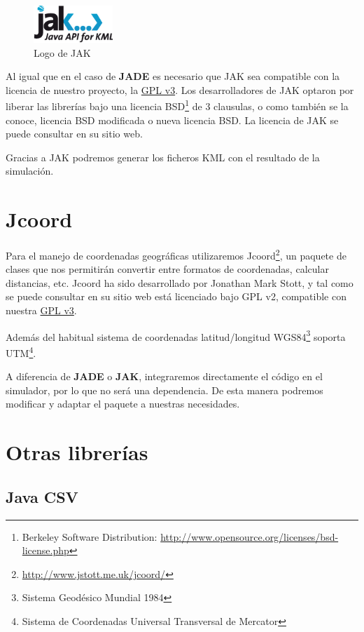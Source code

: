 \begin{figure}[H]
 \centering
 \includegraphics[width=30mm]{figuras/cap4/jak.png}
 \caption{Logo de JAK}
\end{figure}

Al igual que en el caso de {\bf JADE} es necesario que JAK sea compatible con
la licencia de nuestro proyecto, la \hyperref[ap1]{GPL v3}.
Los desarrolladores de JAK optaron por liberar las librerías bajo una licencia
BSD\footnote{Berkeley Software Distribution:
\url{http://www.opensource.org/licenses/bsd-license.php}} de 3 clausulas, o como
también se la conoce, licencia BSD modificada o nueva licencia BSD. La licencia
de JAK se puede consultar en su sitio web.

Gracias a JAK podremos generar los ficheros KML con el resultado de la
simulación.

\section{Jcoord}

Para el manejo de coordenadas geográficas utilizaremos
Jcoord\footnote{\url{http://www.jstott.me.uk/jcoord/}}, un paquete de clases que
nos permitirán convertir entre formatos de coordenadas, calcular distancias,
etc. Jcoord ha sido desarrollado por Jonathan Mark Stott, y tal como se puede
consultar en su sitio web está licenciado bajo GPL v2, compatible con nuestra
\hyperref[ap1]{GPL v3}.

Además del habitual sistema de coordenadas latitud/longitud
WGS84\footnote{Sistema Geodésico Mundial 1984} soporta UTM\footnote{Sistema de
Coordenadas Universal Transversal de Mercator}.

A diferencia de {\bf JADE} o {\bf JAK}, integraremos directamente el código en
el simulador, por lo que no será una dependencia. De esta manera podremos
modificar y adaptar el paquete a nuestras necesidades.

\section{Otras librerías}

\subsection{Java CSV}

